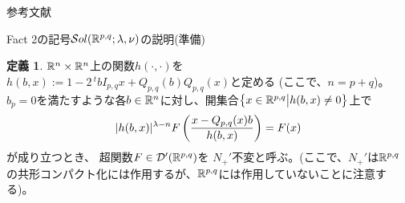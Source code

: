 \documentclass[notheorems]{beamer}
\renewcommand{\Q}{Q_{p,q}}
\newcommand{\sol}{\mathcal{S}ol(\R^{p,q};\lambda,\nu)}
\theoremstyle{definition}
\newtheorem{definition}{{定義}}
\theoremstyle{example}
\theoremstyle{remark}
\theoremstyle{mystyle}
\begin{document}
\begin{frame}[allowframebreaks]{参考文献}
	
\end{frame}

\begin{frame}{Fact 2の記号$\sol$の説明(準備)}
\begin{definition} \label{def1}
	$\mathbb{R}^n\times\mathbb{R}^n$上の関数$h(\cdot,\cdot)$を
	$h(b,x):=1-2\,^t\!bI_{p,q}x+\Q(b)\Q(x)$と定める (ここで、$n=p+q$)。 
	$b_p=0$を満たすよう{な}各$b\in\mathbb{R}^n$に対し、開集合$\left\{x\in\mathbb{R}^{p,q}\big| h(b,x)\neq0\right\}$上で
	\vspace{-1em}
  \begin{equation*}
    \label{eq-Nequiv} | h(b,x) |^{\lambda - n} F \left(
    \frac{x - \Q (x) b}{h(b,x)} \right) = F (x)
	\vspace{-1em}
  \end{equation*}
  が成り立つとき、
	超関数$F \in \mathcal{D}' (\mathbb{R}^{p,q})$を
	{$N_+'$不変}と呼ぶ。(ここで、$N_+'$は$\mathbb{R}^{p,q}$の共形コンパクト化には作用するが、$\mathbb{R}^{p,q}$には作用していないことに注意する)。
\end{definition}
\end{frame}
\end{document}

